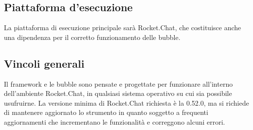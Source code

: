 \subsection{Piattaforma d'esecuzione}
La piattaforma di esecuzione principale sarà Rocket.Chat, che costituisce anche una dipendenza per il corretto funzionamento delle bubble.

\subsection{Vincoli generali}
Il framework e le bubble sono pensate e progettate per funzionare all'interno dell'ambiente Rocket.Chat, in qualsiasi sistema operativo su cui sia possibile usufruirne. La versione minima di Rocket.Chat richiesta è la 0.52.0, ma si richiede di mantenere aggiornato lo strumento in quanto soggetto a frequenti aggiornamenti che incrementano le funzionalità e correggono alcuni errori.


